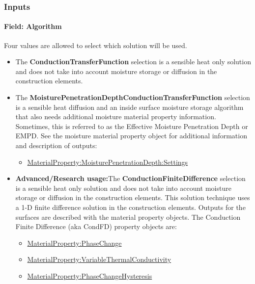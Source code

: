 \subsubsection{Inputs}\label{inputs-6-025}

\paragraph{Field: Algorithm}\label{field-algorithm-2-000}

Four values are allowed to select which solution will be used.

\begin{itemize}
\item
  The \textbf{ConductionTransferFunction} selection is a sensible heat only solution and does not take into account moisture storage or diffusion in the construction elements.
\item
  The \textbf{MoisturePenetrationDepthConductionTransferFunction} selection is a sensible heat diffusion and an inside surface moisture storage algorithm that also needs additional moisture material property information. Sometimes, this is referred to as the Effective Moisture Penetration Depth or EMPD. See the moisture material property object for additional information and description of outputs:
  \begin{itemize}
  \item
    \hyperref[materialpropertymoisturepenetrationdepthsettings]{MaterialProperty:MoisturePenetrationDepth:Settings}
  \end{itemize}
\item
  \textbf{Advanced/Research usage:}The \textbf{ConductionFiniteDifference} selection is a sensible heat only solution and does not take into account moisture storage or diffusion in the construction elements. This solution technique uses a 1-D finite difference solution in the construction elements. Outputs for the surfaces are described with the material property objects. The Conduction Finite Difference (aka CondFD) property objects are:
  \begin{itemize}
  \item
    \hyperref[materialpropertyphasechange]{MaterialProperty:PhaseChange}
  \item
    \hyperref[materialpropertyvariablethermalconductivity]{MaterialProperty:VariableThermalConductivity}
  \item
    \hyperref[materialpropertyphasechangehysteresis]{MaterialProperty:PhaseChangeHysteresis}
  \end{itemize}

\end{itemize}
